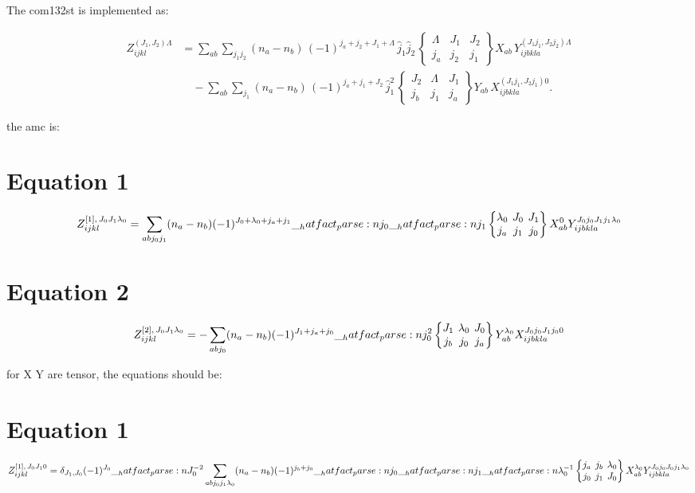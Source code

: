 \documentclass{scrartcl}
\newcommand{\sixj}[6]{\begingroup\setlength{\arraycolsep}{0.2em}\begin{Bmatrix} #1 & #2 & #3 \\ #4 & #5 & #6 \end{Bmatrix}\endgroup}
\begin{document}
The com132st is implemented as:

\begin{align}
Z_{ijkl}^{(J_1,J_2)\Lambda}
&=
\sum_{ab}\sum_{j_1 j_2}
(n_a-n_b)\,
(-1)^{j_a+j_2+J_1+\Lambda}\,
\hat{j}_1\hat{j}_2\,
\begin{Bmatrix}
\Lambda & J_1 & J_2\\
j_a & j_2 & j_1
\end{Bmatrix}
X_{ab}\,
Y_{ijbkla}^{(J_1j_1,J_2j_2)\Lambda}
\nonumber\\
&\quad
-\sum_{ab}\sum_{j_1}
(n_a-n_b)\,
(-1)^{j_a+j_1+J_2}\,
\hat{j}_1^2\,
\begin{Bmatrix}
J_2 & \Lambda & J_1\\
j_b & j_1 & j_a
\end{Bmatrix}
Y_{ab}\,
X_{ijbkla}^{(J_1j_1,J_2j_1)0}.
\end{align}

the amc is:

\section{Equation 1}
\begin{dmath*}
Z_{i j k l}^{[1],\,{J}_{0} {J}_{1} {{\lambda}}_{0}}
= \sum_{a b {j}_{0} {j}_{1}}
(n_a-n_b) \*
(-1)^{{J}_{0}+{{\lambda}}_{0}+{j}_{a}+{j}_{1}} \*
\hatfact{{j}_{0}} \* \hatfact{{j}_{1}} \*
\sixj{{{\lambda}}_{0}}{{J}_{0}}{{J}_{1}}{{j}_{a}}{{j}_{1}}{{j}_{0}} \*
X_{a b}^{0} \*
Y_{i j b k l a}^{{J}_{0} {j}_{0} {J}_{1} {j}_{1} {{\lambda}}_{0}}
\end{dmath*}

\section{Equation 2}
\begin{dmath*}
Z_{i j k l}^{[2],\,{J}_{0} {J}_{1} {{\lambda}}_{0}}
= -\sum_{a b {j}_{0}}
(n_a-n_b) \*
(-1)^{{J}_{1}+{j}_{a}+{j}_{0}} \*
\hatfact{{j}_{0}^{2}} \*
\sixj{{J}_{1}}{{{\lambda}}_{0}}{{J}_{0}}{{j}_{b}}{{j}_{0}}{{j}_{a}} \*
Y_{a b}^{{{\lambda}}_{0}} \*
X_{i j b k l a}^{{J}_{0} {j}_{0} {J}_{1} {j}_{0} 0}
\end{dmath*}

for X Y are tensor, the equations should be:

\section{Equation 1}
\begin{dmath*}
Z_{i j k l}^{[1],\,{J}_{0} {J}_{1} 0}
= \delta_{{J}_{1},{J}_{0}} \* (-1)^{{J}_{0}} \* \hatfact{{J}_{0}^{-2}} \*
\sum_{a b {j}_{0} {j}_{1} {{\lambda}}_{0}} \*
(n_a-n_b) \*
(-1)^{{j}_{b}+{j}_{0}} \* \hatfact{{j}_{0}} \* \hatfact{{j}_{1}} \* \hatfact{{{\lambda}}_{0}^{-1}} \*
\sixj{{j}_{a}}{{j}_{b}}{{{\lambda}}_{0}}{{j}_{0}}{{j}_{1}}{{J}_{0}} \*
X_{a b}^{{{\lambda}}_{0}} \*
Y_{i j b k l a}^{{J}_{0} {j}_{0} {J}_{0} {j}_{1} {{\lambda}}_{0}}
\end{dmath*}
\end{document}
